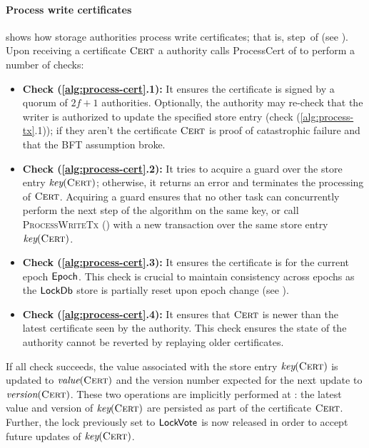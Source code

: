 \paragraph{Process write certificates}
 shows how storage authorities process write certificates; that is, step~\seven of  (see ).
%
Upon receiving a certificate $\textsc{Cert}$ a \sysname authority calls \textsf{ProcessCert} of  to perform a number of checks:
\begin{itemize}
    \item \textbf{Check (\ref{alg:process-cert}.1):} It ensures the certificate is signed by a quorum of $2f+1$ authorities. Optionally, the authority may re-check that the writer is authorized to update the specified store entry (check (\ref{alg:process-tx}.1)); if they aren't the certificate $\textsc{Cert}$ is proof of catastrophic failure and that the BFT assumption broke.
    \item \textbf{Check (\ref{alg:process-cert}.2):} It tries to acquire a guard over the store entry $\emph{key}(\textsc{Cert})$; otherwise, it returns an error and terminates the processing of $\textsc{Cert}$. Acquiring a guard ensures that no other task can concurrently perform the next step of the algorithm on the same key, or call \textsc{ProcessWriteTx} () with a new transaction over the same store entry $\emph{key}(\textsc{Cert})$.
    \item \textbf{Check (\ref{alg:process-cert}.3):} It ensures the certificate is for the current epoch $\textsf{Epoch}$. This check is crucial to maintain consistency across epochs as the $\textsf{LockDb}$ store is partially reset upon epoch change (see ).
    \item \textbf{Check (\ref{alg:process-cert}.4):} It ensures that $\textsc{Cert}$ is newer than the latest certificate seen by the authority. This check ensures the state of the authority cannot be reverted by replaying older certificates.
\end{itemize}

If all check succeeds, the value associated with the store entry $\emph{key}(\textsc{Cert})$ is updated to $\emph{value}(\textsc{Cert})$ and the version number expected for the next update to $\emph{version}(\textsc{Cert})$. These two operations are implicitly performed at : the latest value and version of $\emph{key}(\textsc{Cert})$ are persisted as part of the certificate $\textsc{Cert}$. Further, the lock previously set to $\textsf{LockVote}$ is now released in order to accept future updates of $\emph{key}(\textsc{Cert})$.

